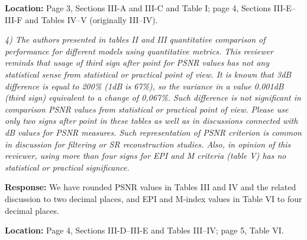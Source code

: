 \documentclass[11pt,letterpaper]{article}
\begin{document}
\textbf{Location:} Page 3, Sections III-A and III-C and Table I; page 4, Sections III-E--III-F and Tables IV--V (originally III--IV).

\textit{4) The authors presented in tables II and III quantitative comparison of performance for different models using quantitative metrics. This reviewer reminds that usage of third sign after point for PSNR values has not any statistical sense from statistical or practical point of view. It is known that 3dB difference is equal to 200\% (1dB is 67\%), so the variance in a value 0.001dB (third sign) equivalent to a change of 0,067\%. Such difference is not significant in comparison PSNR values from statistical or practical point of view. Please use only two signs after point in these tables as well as in discussions connected with dB values for PSNR measures. Such representation of PSNR criterion is common in discussion for filtering or SR reconstruction studies. Also, in opinion of this reviewer, using more than four signs for EPI and M criteria (table V) has no statistical or practical significance.}

\medskip
\textbf{Response:} We have rounded PSNR values in Tables III and IV and the related discussion to two decimal places, and EPI and M-index values in Table VI to four decimal places.

\textbf{Location:} Page 4, Sections III-D--III-E and Tables III--IV; page 5, Table VI.
\end{document}
